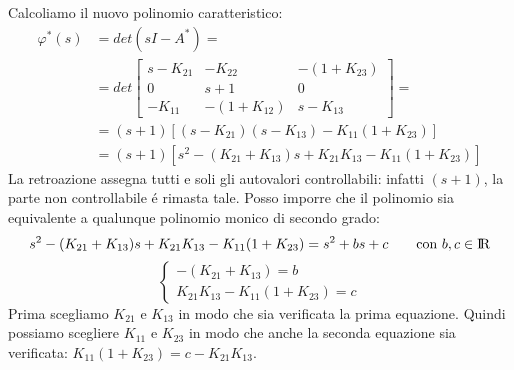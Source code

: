 \begin{Exercise}[title={Studio completo del sistema e stabilizzazione}, difficulty=3]
			Calcoliamo il nuovo polinomio caratteristico:
			\begin{align*}
				\varphi^{*}(s) &= det(sI-A^{*}) =\\
				&= det
				\begin{bmatrix}
					s-K_{21} & -K_{22} & -(1+K_{23})\\
					0 & s+1 & 0\\
					-K_{11} & -(1+K_{12}) & s-K_{13}
				\end{bmatrix} =\\
				&= (s+1)\left[ (s-K_{21})(s-K_{13}) - K_{11}(1+K_{23}) \right]\\ 
				&= (s+1)\left[ s^2 - (K_{21}+K_{13})s + K_{21}K_{13} - K_{11}(1+K_{23}) \right]
			\end{align*}
			La retroazione assegna tutti e soli gli autovalori controllabili: infatti $ (s+1) $, la parte non controllabile \'e rimasta tale. Posso imporre che il polinomio sia equivalente a qualunque polinomio monico di secondo grado:
			\[ s^2 - (K_{21}+K_{13})s + K_{21}K_{13} - K_{11}(1+K_{23}) = s^2 + bs + c \qquad \text{con}\ b,c \in \rm I\!R \]
			\[
				\begin{cases}
					-(K_{21} + K_{13}) = b\\
					K_{21} K_{13} - K_{11}(1+K_{23}) = c
				\end{cases}
			\]
			Prima scegliamo $ K_{21} $ e $ K_{13} $ in modo che sia verificata la prima equazione. Quindi possiamo scegliere $ K_{11} $ e $ K_{23} $ in modo che anche la seconda equazione sia verificata: $ K_{11}(1+K_{23}) = c - K_{21}K_{13} $.
	\end{Exercise}
